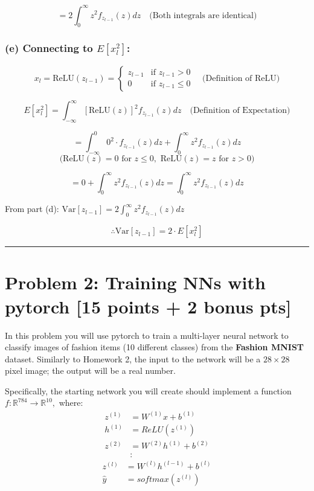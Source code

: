 \documentclass[
  letterpaper,
  DIV=11,
  numbers=noendperiod]{scrartcl}
\begin{document}
\[= 2 \int_{0}^{\infty} z^2 f_{z_{l-1}}(z) dz \quad \text{(Both integrals are identical)}\]

\subsubsection{\texorpdfstring{(e) Connecting to
\(E[x_l^2]\):}{(e) Connecting to E{[}x\_l\^{}2{]}:}}\label{e-connecting-to-ex_l2}

\[x_l = \text{ReLU}(z_{l-1}) = \begin{cases} z_{l-1} & \text{if } z_{l-1} > 0 \\ 0 & \text{if } z_{l-1} \leq 0 \end{cases} \quad \text{(Definition of ReLU)}\]

\[E[x_l^2] = \int_{-\infty}^{\infty} [\text{ReLU}(z)]^2 f_{z_{l-1}}(z) dz \quad \text{(Definition of Expectation)}\]

\[= \int_{-\infty}^{0} 0^2 \cdot f_{z_{l-1}}(z) dz + \int_{0}^{\infty} z^2 f_{z_{l-1}}(z) dz\]
\[\text{(ReLU}(z) = 0 \text{ for } z \leq 0, \text{ ReLU}(z) = z \text{ for } z > 0)\]

\[= 0 + \int_{0}^{\infty} z^2 f_{z_{l-1}}(z) dz = \int_{0}^{\infty} z^2 f_{z_{l-1}}(z) dz\]

From part (d):
\(\text{Var}[z_{l-1}] = 2 \int_{0}^{\infty} z^2 f_{z_{l-1}}(z) dz\)

\[\therefore \text{Var}[z_{l-1}] = 2 \cdot E[x_l^2]\]

\begin{center}\rule{0.5\linewidth}{0.5pt}\end{center}

\section{Problem 2: Training NNs with pytorch {[}15 points + 2 bonus
pts{]}}\label{problem-2-training-nns-with-pytorch-15-points-2-bonus-pts}

In this problem you will use pytorch to train a multi-layer neural
network to classify images of fashion items (10 different classes) from
the \textbf{Fashion MNIST} dataset. Similarly to Homework 2, the input
to the network will be a \(28\times28\) pixel image; the output will be
a real number.

Specifically, the starting network you will create should implement a
function \(f:\mathbb{R}^{784}\rightarrow\mathbb{R}^{10},\) where:
\[\begin{aligned}z^{(1)}&=W^{(1)}x+b^{(1)}\\ h^{(1)}&=ReLU(z^{(1)})\\ z^{(2)}&=W^{(2)}h^{(1)}+b^{(2)}\\ &:\end{aligned}\]
\[\begin{aligned}z^{(l)}&=W^{(l)}h^{(l-1)}+b^{(l)}\\ \hat{y}&=softmax(z^{(l)})\end{aligned}\]
\end{document}
